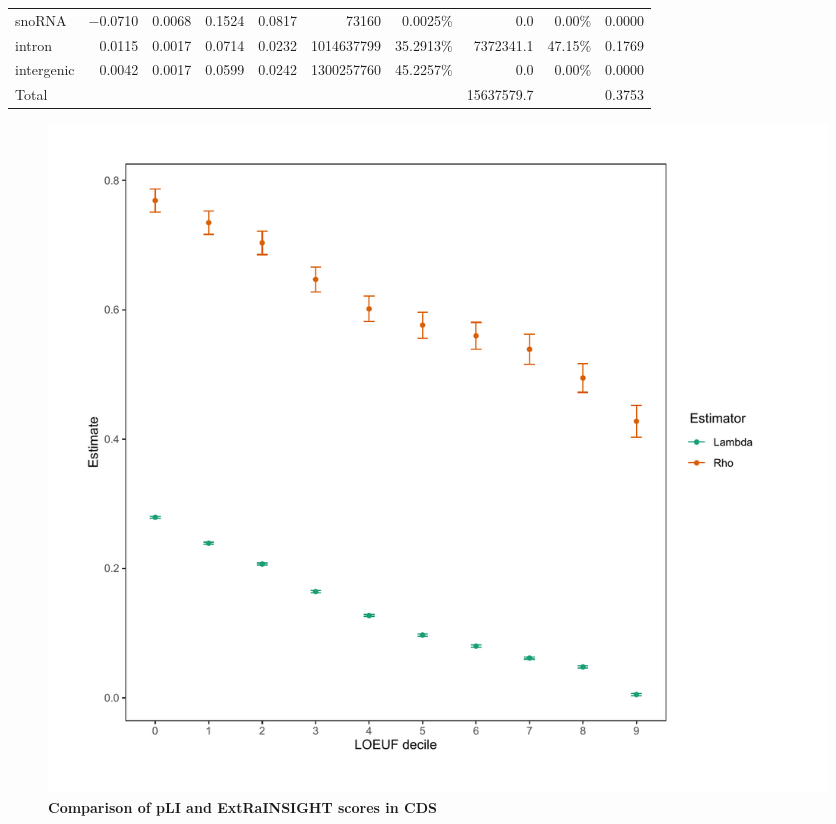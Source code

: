 \documentclass[11pt]{article}
\begin{document}
\begin{landscape}
\begin{table}
\begin{footnotesize}
\begin{tabular}{lrrrrrrrrr}
snoRNA & $-$0.0710 & 0.0068 & 0.1524 & 0.0817 & 73160 & 0.0025\% & 0.0 & 0.00\% & 0.0000\\
intron & 0.0115 & 0.0017 & 0.0714 & 0.0232 & 1014637799 & 35.2913\% &  7372341.1 & 47.15\% & 0.1769\\
intergenic & 0.0042 & 0.0017 & 0.0599 & 0.0242 & 1300257760 & 45.2257\% & 0.0 & 0.00\% & 0.0000\\
    \hline
Total &  &  &  &  & & & 15637579.7 &  & 0.3753\\
    \hline
  \end{tabular}
  \end{footnotesize}
\end{table}
\end{landscape}


\begin{figure}[t]
    \centering
    \includegraphics[width=0.75\linewidth]{figures/LOEUF.pdf}
    \caption{\textbf{Comparison of pLI and ExtRaINSIGHT scores in CDS}}
    \label{fig:loeuf}
\end{figure}

\clearpage 

\end{document}

